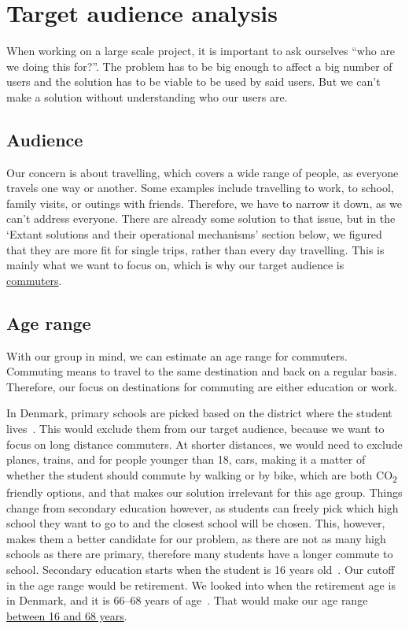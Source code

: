 \section{Target audience analysis}\label{sec:target-audience-analysis}

When working on a large scale project, it is important to ask ourselves ``who are we doing this for?''.
The problem has to be big enough to affect a big number of users and the solution has to be viable to be used by said
users.
But we can't make a solution without understanding who our users are.

\subsection{Audience}\label{subsec:audience}

Our concern is about travelling, which covers a wide range of people, as everyone travels one way or another.
Some examples include travelling to work, to school, family visits, or outings with friends.
Therefore, we have to narrow it down, as we can't address everyone.
There are already some solution to that issue, but in the `Extant solutions and their operational mechanisms' section
below, we figured that they are more fit for single trips, rather than every day travelling.
This is mainly what we want to focus on, which is why our target audience is \underline{commuters}.

\subsection{Age range}\label{subsec:age-range}

With our group in mind, we can estimate an age range for commuters.
Commuting means to travel to the same destination and back on a regular basis.
Therefore, our focus on destinations for commuting are either education or work.

In Denmark, primary schools are picked based on the district where the student lives~\cite{primary_school}.
This would exclude them from our target audience, because we want to focus on long distance commuters.
At shorter distances, we would need to exclude planes, trains, and for people younger than 18, cars, making it a matter
of whether the student should commute by walking or by bike, which are both \unit{CO_{2}} friendly options, and that
makes our solution irrelevant for this age group.
Things change from secondary education however, as students can freely pick which high school they want to go to and the
closest school will be chosen.
This, however, makes them a better candidate for our problem, as there are not as many high schools as there are
primary, therefore many students have a longer commute to school.
Secondary education starts when the student is 16 years old~\cite{secondary_school}.
Our cutoff in the age range would be retirement.
We looked into when the retirement age is in Denmark, and it is 66--68 years of age~\cite{retirement}.
That would make our age range \underline{between 16 and 68 years}.

